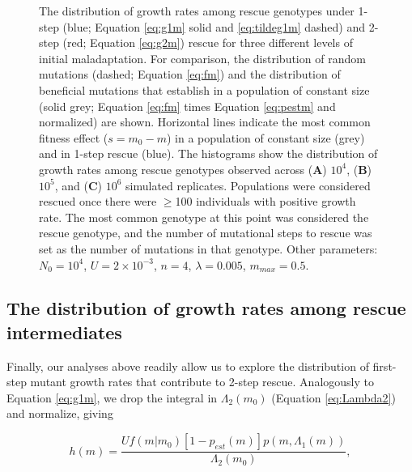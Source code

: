 \documentclass[9pt,twocolumn,twoside,lineno]{gsajnl}
\begin{document}
\begin{figure}[htbp]
\caption{
The distribution of growth rates among rescue genotypes under 1-step (blue; Equation \ref{eq:g1m} solid and \ref{eq:tildeg1m} dashed) and 2-step (red; Equation \ref{eq:g2m}) rescue for three different levels of initial maladaptation.
For comparison, the distribution of random mutations (dashed; Equation \ref{eq:fm}) and the distribution of beneficial mutations that establish in a population of constant size (solid grey; Equation \ref{eq:fm} times Equation \ref{eq:pestm} and normalized) are shown.
Horizontal lines indicate the most common fitness effect ($s=m_0-m$) in a population of constant size (grey) and in 1-step rescue (blue).
The histograms show the distribution of growth rates among rescue genotypes observed across (\textbf{A}) $10^4$, (\textbf{B}) $10^5$, and (\textbf{C}) $10^6$ simulated replicates.
Populations were considered rescued once there were $\geq$100 individuals with positive growth rate.
The most common genotype at this point was considered the rescue genotype, and the number of mutational steps to rescue was set as the number of mutations in that genotype. 
Other parameters: $N_0=10^4$, $U=2\times 10^{-3}$, $n=4$, $\lambda=0.005$, $m_{max}=0.5$.
}%
\label{fig:1and2stepDFE}
\end{figure}

\subsection{The distribution of growth rates among rescue intermediates}
\label{sec:m1DFE}

Finally, our analyses above readily allow us to explore the distribution of first-step mutant growth rates that contribute to 2-step rescue.
Analogously to Equation \ref{eq:g1m}, we drop the integral in $\Lambda_2(m_0)$ (Equation \ref{eq:Lambda2}) and normalize, giving

\begin{equation}\label{eq:hm}
h(m) = \frac{U f(m|m_0) \left[ 1 - p_{est}(m) \right] p(m,\Lambda_{1}(m))}{\Lambda_2(m_0)},
\end{equation}
\end{document}

